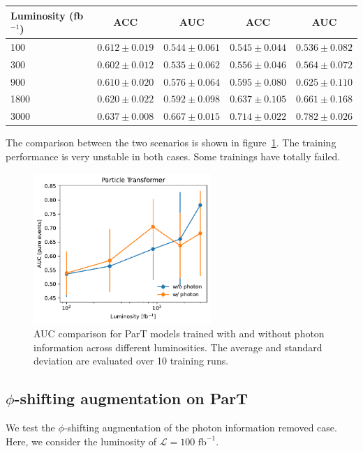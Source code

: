 \documentclass[12pt]{article}
\begin{document}
\begin{table}[htpb]
{\begin{tabular}{l|cc|cc}
                    Luminosity (fb$^{-1}$)  & ACC               & AUC               & ACC               & AUC               \\ \hline
                    100                     & $0.612 \pm 0.019$ & $0.544 \pm 0.061$ & $0.545 \pm 0.044$ & $0.536 \pm 0.082$ \\
                    300                     & $0.602 \pm 0.012$ & $0.535 \pm 0.062$ & $0.556 \pm 0.046$ & $0.564 \pm 0.072$ \\
                    900                     & $0.610 \pm 0.020$ & $0.576 \pm 0.064$ & $0.595 \pm 0.080$ & $0.625 \pm 0.110$ \\
                    1800                    & $0.620 \pm 0.022$ & $0.592 \pm 0.098$ & $0.637 \pm 0.105$ & $0.661 \pm 0.168$ \\
                    3000                    & $0.637 \pm 0.008$ & $0.667 \pm 0.015$ & $0.714 \pm 0.022$ & $0.782 \pm 0.026$ \\
                \end{tabular}
            }
        \end{table}

        The comparison between the two scenarios is shown in figure~\ref{fig:ParT_AUC_various_L}. The training performance is very unstable in both cases. Some trainings have totally failed.
        \begin{figure}[htpb]
            \centering
            \includegraphics[width=0.60\textwidth]{ParT_AUC-true_L.pdf}
            \caption{AUC comparison for ParT models trained with and without photon information across different luminosities. The average and standard deviation are evaluated over 10 training runs.}
            \label{fig:ParT_AUC_various_L}
        \end{figure}
    \subsection{\texorpdfstring{$\phi$}{phi}-shifting augmentation on ParT}%
    \label{sub:phi_shifting_augmentation_on_part}
        We test the $\phi$-shifting augmentation of the photon information removed case. Here, we consider the luminosity of $\mathcal{L} = \text{100 fb}^{-1}$.
        
\end{document}
